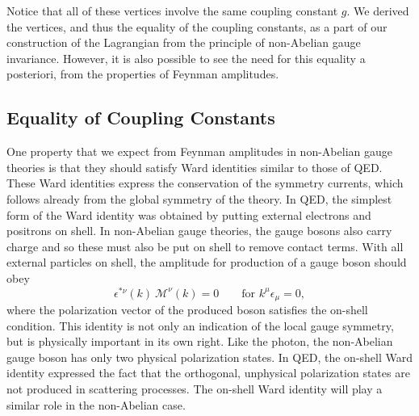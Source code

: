 Notice that all of these vertices involve the same coupling constant $g$.
We derived the vertices, and thus the equality of the coupling constants, as
a part of our construction of the Lagrangian from the principle of
non-Abelian gauge invariance.  However, it is also possible to see the need
for this equality a posteriori, from the properties of Feynman amplitudes.

\subsection{Equality of Coupling Constants}

One property that we expect from Feynman amplitudes in non-Abelian gauge
theories is that they should satisfy Ward identities similar to those of QED.
These Ward identities express the conservation of the symmetry currents,
which follows already from the global symmetry of the theory.  In QED, the
simplest form of the Ward identity was obtained by putting external electrons
and positrons on shell.  In non-Abelian gauge theories, the gauge bosons also
carry charge and so these must also be put on shell to remove contact terms.
With all external particles on shell, the amplitude for production of a gauge
boson should obey
\begin{equation}
  \epsilon^{*\nu}(k)\ \mathcal{M}^\nu(k) = 0
  \qquad\text{for } k^\mu\epsilon_\mu = 0 ,
  \label{eq:16.10}
\end{equation}
where the polarization vector of the produced boson satisfies the on-shell
condition.  This identity is not only an indication of the local gauge
symmetry, but is physically important in its own right.  Like the photon, the
non-Abelian gauge boson has only two physical polarization states.  In QED,
the on-shell Ward identity expressed the fact that the orthogonal, unphysical
polarization states are not produced in scattering processes.  The on-shell
Ward identity will play a similar role in the non-Abelian case.

